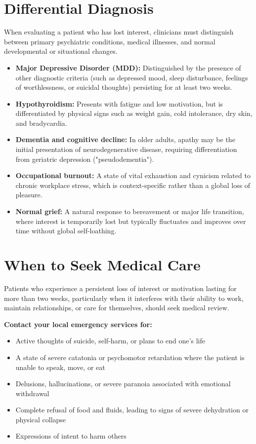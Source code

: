 \section*{Differential Diagnosis}
When evaluating a patient who has lost interest, clinicians must distinguish between primary psychiatric conditions, medical illnesses, and normal developmental or situational changes.
\begin{itemize}
    \item \textbf{Major Depressive Disorder (MDD):} Distinguished by the presence of other diagnostic criteria (such as depressed mood, sleep disturbance, feelings of worthlessness, or suicidal thoughts) persisting for at least two weeks.
    \item \textbf{Hypothyroidism:} Presents with fatigue and low motivation, but is differentiated by physical signs such as weight gain, cold intolerance, dry skin, and bradycardia.
    \item \textbf{Dementia and cognitive decline:} In older adults, apathy may be the initial presentation of neurodegenerative disease, requiring differentiation from geriatric depression ("pseudodementia").
    \item \textbf{Occupational burnout:} A state of vital exhaustion and cynicism related to chronic workplace stress, which is context-specific rather than a global loss of pleasure.
    \item \textbf{Normal grief:} A natural response to bereavement or major life transition, where interest is temporarily lost but typically fluctuates and improves over time without global self-loathing.
\end{itemize}

\section*{When to Seek Medical Care}
Patients who experience a persistent loss of interest or motivation lasting for more than two weeks, particularly when it interferes with their ability to work, maintain relationships, or care for themselves, should seek medical review.

\textbf{Contact your local emergency services for:}
\begin{itemize}
    \item Active thoughts of suicide, self-harm, or plans to end one's life
    \item A state of severe catatonia or psychomotor retardation where the patient is unable to speak, move, or eat
    \item Delusions, hallucinations, or severe paranoia associated with emotional withdrawal
    \item Complete refusal of food and fluids, leading to signs of severe dehydration or physical collapse
    \item Expressions of intent to harm others
\end{itemize}

